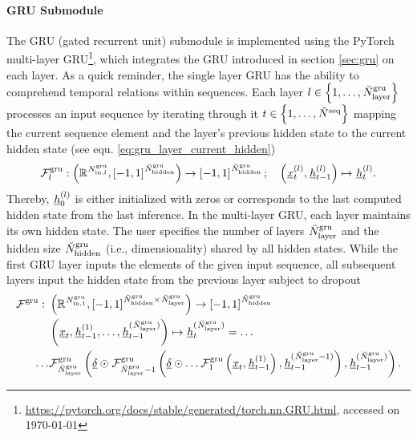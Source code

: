 \newcommand{\GRUMap}{\Func[]{\gru}{}{}{}}
\newcommand{\GRUDropout}{\underline\delta}
\newcommand{\GRUDropoutP}{\prob[\user]{\gru}{}{}{}}
\newcommand{\GRUNumP}{\num[]{\gru}{\params}{}{}}

\paragraph*{GRU Submodule} ${}$\\
The GRU (gated recurrent unit) submodule
is implemented using the PyTorch
multi-layer GRU\footnote{
    \url{https://pytorch.org/docs/stable/generated/torch.nn.GRU.html}, accessed on \today
},
which integrates the GRU \cite{Cho2014} 
introduced in section \ref{sec:gru} on each layer.
As a quick reminder, 
the single layer GRU 
has the ability to comprehend temporal relations within sequences.
Each layer 
$l \in \setOfInts{1, \dots, \GRUNumLayer}$ 
processes an input sequence by
iterating through it
$t \in \setOfInts{1, \dots, \seqLen}$ 
mapping the current sequence element
and the layer's previous hidden state
to the current hidden state (see equ. \ref{eq:gru_layer_current_hidden})
\begin{align}
    \GRULayerMap{l}
    :
    \tuple{
        \R{\GRUInp{l}}, 
        \setR{-1, 1}^{\GRUHiddenSize}
    }
    \rightarrow 
    \setR{-1, 1}^{\GRUHiddenSize}
    ;\quad
    \tuple{\featvec[]{(l)}{t}{}{}, \hiddenstate[]{(l)}{t-1}{}{}}
    \mapsto
    \hiddenstate[]{(l)}{t}{}{}.
\end{align}
Thereby, $\hiddenstate[]{(l)}{0}{}{}$ is either initialized with zeros 
or corresponds to the last computed hidden state from the last inference.
 In the multi-layer GRU,
each layer maintains its own hidden state.
The user specifies the number of layers 
$\GRUNumLayer$
and the hidden size 
$\GRUHiddenSize$ (i.e., dimensionality) shared by all hidden states.
While the first GRU layer inputs the elements of the given input sequence,
all subsequent layers input the hidden state from the previous layer subject to dropout
\begin{align} \label{eq:gru}
    \GRUMap
    :\ &
    \tuple{
        \R{\GRUInp{1}},
        \setR{-1, 1}^{\GRUHiddenSize \times \GRUNumLayer}
    }
    \rightarrow 
    \setR{-1, 1}^{\GRUHiddenSize}
    \nonumber \\
    &\tuple{
        \featvec[]{}{t}{}{}, 
        \hiddenstate[]{(1)}{t-1}{}{},
        \dots,
        \hiddenstate[]{(\GRUNumLayer)}{t-1}{}{}
    }
    \mapsto 
    \hiddenstate[]{(\GRUNumLayer)}{t}{}{} =
    \dots
    \nonumber \\
    \dots &\GRULayerMap{\GRUNumLayer} \tuple{
        \GRUDropout \odot
        \GRULayerMap{\GRUNumLayer - 1} \tuple{
            \GRUDropout \odot
                \dots \GRULayerMap{1} \tuple{
                    \featvec[]{}{t}{}{}
                    ,
                    \hiddenstate[]{(1)}{t-1}{}{}
                }
            ,
            \hiddenstate[]{(\GRUNumLayer-1)}{t-1}{}{}
        },
        \hiddenstate[]{(\GRUNumLayer)}{t-1}{}{}
    }
    .
\end{align}
